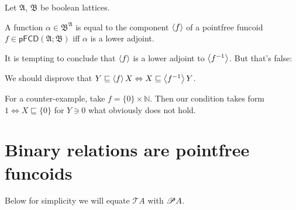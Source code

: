 \begin{conjecture}
  Let $\mathfrak{A}$, $\mathfrak{B}$ be boolean lattices.
  
  A function $\alpha \in \mathfrak{B}^{\mathfrak{A}}$ is equal to the
  component $\left\langle f\right\rangle$ of a pointfree funcoid $f \in \mathsf{pFCD}
  (\mathfrak{A}; \mathfrak{B})$ iff $\alpha$ is a lower adjoint.
\end{conjecture}

It is tempting to conclude that $\left\langle f\right\rangle$ is a lower adjoint to
$\left\langle f^{- 1}\right\rangle$. But that's false:

We should disprove that $Y \sqsubseteq \left\langle f\right\rangle X \Leftrightarrow X
\sqsubseteq \left\langle f^{- 1}\right\rangle Y$.

For a counter-example, take $f = \{ 0 \} \times \mathbb{N}$. Then our
condition takes form $1 \Leftrightarrow X \sqsubseteq \{ 0 \}$ for $Y \ni 0$
what obviously does not hold.

\section{Binary relations are pointfree funcoids}

Below for simplicity we will equate $\mathscr{T}A$ with $\mathscr{P} A$.

